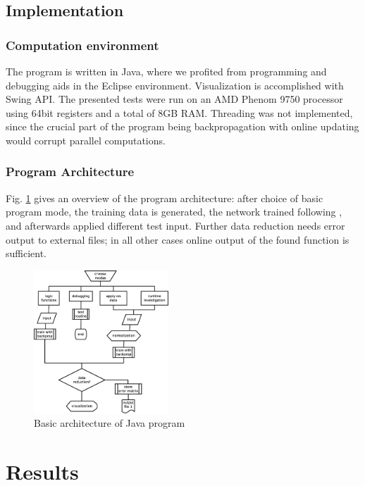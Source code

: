 \documentclass[useAMS,usenatbib]{templates/mn2e}
\begin{document}
\subsection{Implementation}
\subsubsection{Computation environment}
The program is written in {\sc Java}, where we profited from
programming and debugging aids in the {\sc Eclipse}
environment. Visualization is accomplished with {\sc Swing} API. The
presented tests were run on an AMD Phenom 9750 processor using 64bit
registers and a total of 8GB RAM. Threading was not implemented, since
the crucial part of the program being backpropagation with online
updating would corrupt parallel computations.

\subsubsection{Program Architecture}
Fig. \ref{fig:flow} gives an overview of the program architecture:
after choice of basic program mode, the training data is generated,
the network trained following \cite{Stoop2010}, and afterwards applied
different test input. Further data reduction needs error output to
external files; in all other cases online output of the found function
is sufficient.
\begin{figure}
  \begin{center}
    \includegraphics[width=0.45\textwidth]{fig/dia.eps}
  \end{center}
  \caption{\label{fig:flow}Basic architecture of {\rm Java} program}
\end{figure}
%
%
\section{Results}
\label{sec:Results}
%
\end{document}
